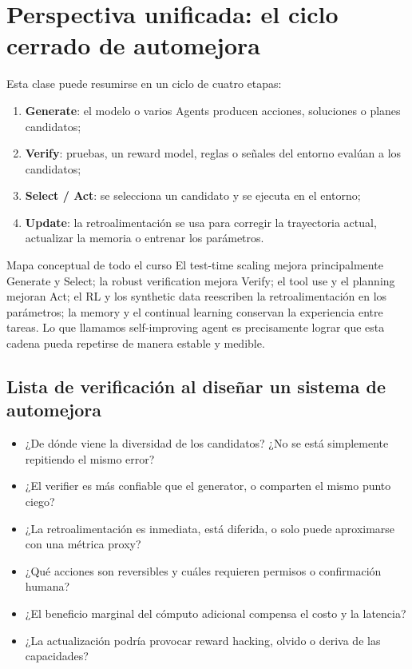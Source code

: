 \documentclass[a4paper]{article}
\begin{document}
\section{Perspectiva unificada: el ciclo cerrado de automejora}

Esta clase puede resumirse en un ciclo de cuatro etapas:

\begin{enumerate}
    \item \textbf{Generate}: el modelo o varios Agents producen acciones, soluciones o planes candidatos;
    \item \textbf{Verify}: pruebas, un reward model, reglas o señales del entorno evalúan a los candidatos;
    \item \textbf{Select / Act}: se selecciona un candidato y se ejecuta en el entorno;
    \item \textbf{Update}: la retroalimentación se usa para corregir la trayectoria actual, actualizar la memoria o entrenar los parámetros.
\end{enumerate}

\begin{importantbox}{Mapa conceptual de todo el curso}
El test-time scaling mejora principalmente Generate y Select; la robust verification mejora Verify; el tool use y el planning mejoran Act; el RL y los synthetic data reescriben la retroalimentación en los parámetros; la memory y el continual learning conservan la experiencia entre tareas. Lo que llamamos self-improving agent es precisamente lograr que esta cadena pueda repetirse de manera estable y medible.
\end{importantbox}

\subsection{Lista de verificación al diseñar un sistema de automejora}

\begin{itemize}
    \item ¿De dónde viene la diversidad de los candidatos? ¿No se está simplemente repitiendo el mismo error?
    \item ¿El verifier es más confiable que el generator, o comparten el mismo punto ciego?
    \item ¿La retroalimentación es inmediata, está diferida, o solo puede aproximarse con una métrica proxy?
    \item ¿Qué acciones son reversibles y cuáles requieren permisos o confirmación humana?
    \item ¿El beneficio marginal del cómputo adicional compensa el costo y la latencia?
    \item ¿La actualización podría provocar reward hacking, olvido o deriva de las capacidades?
\end{itemize}
\end{document}
